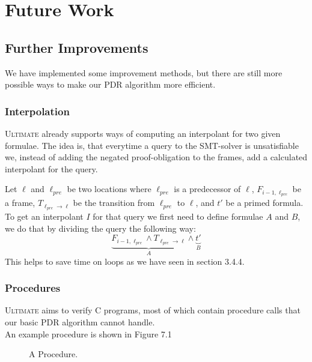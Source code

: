 \documentclass[11pt, a4paper, BCOR=10mm, ngerman]{scrbook}
\begin{document}
\chapter{Future Work}
\section{Further Improvements}
We have implemented some improvement methods, but there are still more possible ways to make our PDR algorithm more efficient.

\subsection{Interpolation}
\textsc{Ultimate} already supports ways of computing an interpolant for two given formulae. The idea is, that everytime a query to the SMT-solver is unsatisfiable we, instead of adding the negated proof-obligation to the frames, add a calculated interpolant for the query. \par
Let $\ell$ and $\ell_{pre}$ be two locations where $\ell_{pre}$ is a predecessor of $\ell$, $F_{i - 1, \ell_{pre}}$ be a frame, $T_{\ell_{pre} \rightarrow \ell}$ be the transition from $\ell_{pre}$ to $\ell$, and $t'$ be a primed formula. \\
To get an interpolant $I$ for that query we first need to define formulae $A$ and $B$, we do that by dividing the query the following way:
\begin{equation*}
\underbrace{F_{i - 1, \ell_{pre}} \land T_{\ell_{pre} \rightarrow \ell}}_{A} \land \underbrace{t'}_B
\end{equation*}
This helps to save time on loops as we have seen in section 3.4.4.
\subsection{Procedures}
\textsc{Ultimate} aims to verify C programs, most of which contain procedure calls that our basic PDR algorithm  cannot handle. \\ An example procedure is shown in Figure 7.1

\begin{figure}[H]
\centering
{}
  \caption{A Procedure.}
 \end{figure}
 \label{procedure Ex}  
\end{document}
